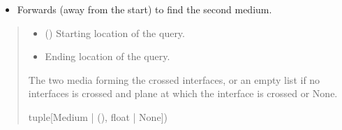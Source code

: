 \documentclass[letterpaper,10pt,english]{sphinxmanual}
\begin{document}
\begin{fulllineitems}
\begin{fulllineitems}
\begin{itemize}
\item {} 
\sphinxAtStartPar
Forwards (away from the start) to find the second medium.

\end{itemize}
\begin{quote}\begin{description}
\begin{itemize}
\item {} 
\sphinxAtStartPar
{} () \textendash{} Starting location of the query.

\item {} 
\sphinxAtStartPar
{} \textendash{} Ending location of the query.

\end{itemize}

\sphinxAtStartPar
{}

\sphinxAtStartPar
The two media forming the crossed interfaces, or an empty list \sphinxtitleref{{[}{]}} if no interfaces is crossed and
plane at which the interface is crossed or None.

\sphinxAtStartPar
tuple{[}Medium | (), float | None{]})

\end{description}\end{quote}

\end{fulllineitems}


\begin{fulllineitems}
\label{\detokenize{generated/photon_canon.optics:photon_canon.optics.System.represent_on_axis}}
\pysigstartsignatures
\pysiglinewithargsret
{}
{}
{}
\pysigstopsignatures
\end{fulllineitems}



\end{fulllineitems}
\end{document}
